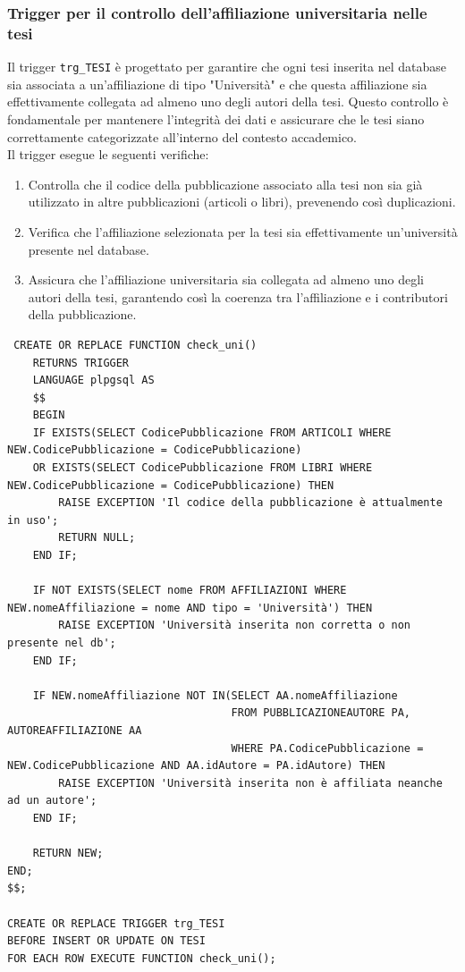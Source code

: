 \documentclass[a4paper,12pt]{article}
\begin{document}
\subsubsection{Trigger per il controllo dell'affiliazione universitaria nelle tesi}
Il trigger \texttt{trg\_TESI} è progettato per garantire che ogni tesi inserita nel database sia associata a un'affiliazione di tipo "Università" e che questa affiliazione sia effettivamente collegata ad almeno uno degli autori della tesi. Questo controllo è fondamentale per mantenere l'integrità dei dati e assicurare che le tesi siano correttamente categorizzate all'interno del contesto accademico.\\
Il trigger esegue le seguenti verifiche:
\begin{enumerate}[label=\textbf{\arabic*}), leftmargin=1.5cm]
    \item Controlla che il codice della pubblicazione associato alla tesi non sia già utilizzato in altre pubblicazioni (articoli o libri), prevenendo così duplicazioni.
    \item Verifica che l'affiliazione selezionata per la tesi sia effettivamente un'università presente nel database.
    \item Assicura che l'affiliazione universitaria sia collegata ad almeno uno degli autori della tesi, garantendo così la coerenza tra l'affiliazione e i contributori della pubblicazione.
\end{enumerate}

\begin{lstlisting}
 CREATE OR REPLACE FUNCTION check_uni()
    RETURNS TRIGGER
    LANGUAGE plpgsql AS 
    $$
    BEGIN
    IF EXISTS(SELECT CodicePubblicazione FROM ARTICOLI WHERE NEW.CodicePubblicazione = CodicePubblicazione)
    OR EXISTS(SELECT CodicePubblicazione FROM LIBRI WHERE NEW.CodicePubblicazione = CodicePubblicazione) THEN
        RAISE EXCEPTION 'Il codice della pubblicazione è attualmente in uso';
        RETURN NULL;
    END IF;
    
    IF NOT EXISTS(SELECT nome FROM AFFILIAZIONI WHERE NEW.nomeAffiliazione = nome AND tipo = 'Università') THEN
        RAISE EXCEPTION 'Università inserita non corretta o non presente nel db';
    END IF;
    
    IF NEW.nomeAffiliazione NOT IN(SELECT AA.nomeAffiliazione
                                   FROM PUBBLICAZIONEAUTORE PA, AUTOREAFFILIAZIONE AA
                                   WHERE PA.CodicePubblicazione = NEW.CodicePubblicazione AND AA.idAutore = PA.idAutore) THEN
        RAISE EXCEPTION 'Università inserita non è affiliata neanche ad un autore';
    END IF;
        
    RETURN NEW;
END;
$$;

CREATE OR REPLACE TRIGGER trg_TESI
BEFORE INSERT OR UPDATE ON TESI
FOR EACH ROW EXECUTE FUNCTION check_uni();
\end{lstlisting}
\end{document}
